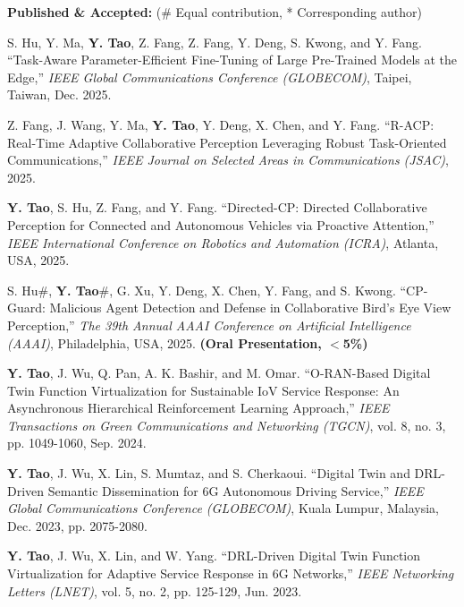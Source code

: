 \documentclass[letterpaper,11pt]{article}
\begin{document}
{{{{{{\large\textbf{Published \& Accepted:} (\# Equal contribution, * Corresponding author)

\begin{justify}
    \normalsize
    S. Hu, Y. Ma, \textbf{Y. Tao},  Z. Fang, Z. Fang, Y. Deng, S. Kwong, and Y. Fang. ``Task-Aware Parameter-Efficient Fine-Tuning of Large Pre-Trained Models at the Edge,'' \textit{IEEE Global Communications Conference (GLOBECOM)}, Taipei, Taiwan, Dec. 2025.
\end{justify}
\begin{justify}
    \normalsize
    Z. Fang, J. Wang, Y. Ma, \textbf{Y. Tao}, Y. Deng, X. Chen, and Y. Fang. ``R-ACP: Real-Time Adaptive Collaborative Perception Leveraging Robust Task-Oriented Communications,'' \textit{IEEE Journal on Selected Areas in Communications (JSAC)}, 2025.
\end{justify}
\begin{justify}
    \normalsize
    \textbf{Y. Tao}, S. Hu, Z. Fang, and Y. Fang. ``Directed-CP: Directed Collaborative Perception for Connected and Autonomous Vehicles via Proactive Attention,'' \textit{IEEE International Conference on Robotics and Automation (ICRA)}, Atlanta, USA, 2025.
\end{justify}
\begin{justify}
    \normalsize
    S. Hu\#, \textbf{Y. Tao}\#, G. Xu, Y. Deng, X. Chen, Y. Fang, and S. Kwong. ``CP-Guard: Malicious Agent Detection and Defense in Collaborative Bird's Eye View Perception,'' \textit{The 39th Annual AAAI Conference on Artificial Intelligence (AAAI)}, Philadelphia, USA, 2025. \textbf{(Oral Presentation, $<$5\%)}
\end{justify}
\begin{justify}
    \normalsize
    \textbf{Y. Tao}, J. Wu, Q. Pan, A. K. Bashir, and M. Omar. ``O-RAN-Based Digital Twin Function Virtualization for Sustainable IoV Service Response: An Asynchronous Hierarchical Reinforcement Learning Approach,'' \textit{IEEE Transactions on Green Communications and Networking (TGCN)}, vol. 8, no. 3, pp. 1049-1060, Sep. 2024.
\end{justify}
\begin{justify}
    \normalsize
    \textbf{Y. Tao}, J. Wu, X. Lin, S. Mumtaz, and S. Cherkaoui. ``Digital Twin and DRL-Driven Semantic Dissemination for 6G Autonomous Driving Service,'' \textit{IEEE Global Communications Conference (GLOBECOM)}, Kuala Lumpur, Malaysia, Dec. 2023, pp. 2075-2080.
\end{justify}
\begin{justify}
    \normalsize
    \textbf{Y. Tao}, J. Wu, X. Lin, and W. Yang. ``DRL-Driven Digital Twin Function Virtualization for Adaptive Service Response in 6G Networks,'' \textit{IEEE Networking Letters (LNET)}, vol. 5, no. 2, pp. 125-129, Jun. 2023.
\end{justify}

}}}}}}
\end{document}

